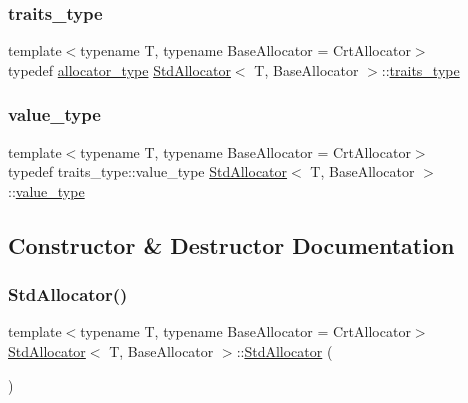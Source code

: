 \subsubsection{\texorpdfstring{traits\+\_\+type}{traits\_type}}
{\footnotesize\ttfamily template$<$typename T, typename Base\+Allocator = Crt\+Allocator$>$ \\
typedef \hyperlink{classStdAllocator_a572b0281d5b161135a426d3ff348d997}{allocator\+\_\+type} \hyperlink{classStdAllocator}{Std\+Allocator}$<$ T, Base\+Allocator $>$\+::\hyperlink{classStdAllocator_a5cc8d5905b0333753db9d7437aeadfc0}{traits\+\_\+type}\hspace{0.3cm}{\ttfamily [private]}}

\mbox{\label{classStdAllocator_aa9b7be996e5529bd6f1cbacadfa090c7}} 
\subsubsection{\texorpdfstring{value\+\_\+type}{value\_type}}
{\footnotesize\ttfamily template$<$typename T, typename Base\+Allocator = Crt\+Allocator$>$ \\
typedef traits\+\_\+type\+::value\+\_\+type \hyperlink{classStdAllocator}{Std\+Allocator}$<$ T, Base\+Allocator $>$\+::\hyperlink{classStdAllocator_aa9b7be996e5529bd6f1cbacadfa090c7}{value\+\_\+type}}



\subsection{Constructor \& Destructor Documentation}
\mbox{\label{classStdAllocator_afdef530c5dbd0c4e86922ab263c8ca83}} 
\subsubsection{\texorpdfstring{Std\+Allocator()}{StdAllocator()}\hspace{0.1cm}{\footnotesize\ttfamily [1/4]}}
{\footnotesize\ttfamily template$<$typename T, typename Base\+Allocator = Crt\+Allocator$>$ \\
\hyperlink{classStdAllocator}{Std\+Allocator}$<$ T, Base\+Allocator $>$\+::\hyperlink{classStdAllocator}{Std\+Allocator} (\begin{DoxyParamCaption}{ }\end{DoxyParamCaption})\hspace{0.3cm}{\ttfamily [inline]}}

